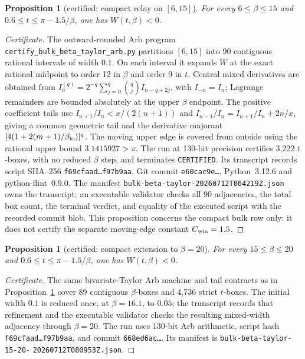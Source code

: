 \documentclass[11pt]{article}
\newtheorem{proposition}[theorem]{Proposition}
\theoremstyle{remark}
\begin{document}
\begin{proposition}[{certified; compact relay on $[6,15]$}]
\label{prop:bulkbetaTaylor}
For every $6\le\beta\le15$ and
$0.6\le t\le\pi-1.5/\beta$, one has $W(t,\beta)<0$.
\end{proposition}

\begin{proof}[Certificate]
The outward-rounded Arb program
\texttt{certify\_bulk\_beta\_taylor\_arb.py} partitions $[6,15]$
into 90 contiguous rational intervals of width $0.1$.  On each interval it
expands $W$ at the exact rational midpoint to order 12 in $\beta$ and order
9 in $t$.  Central mixed derivatives are obtained from
$I_n^{(q)}=2^{-q}\sum_{j=0}^q\binom qj I_{n-q+2j}$, with
$I_{-n}=I_n$; Lagrange remainders are bounded absolutely at the upper
$\beta$ endpoint.  The positive coefficient tails use
$I_{n+1}/I_n<x/(2(n+1))$ and
$I_{n-1}/I_n=I_{n+1}/I_n+2n/x$, giving a common geometric tail and the
derivative majorant
$[4(1+2(m+1)/\beta_{\rm lo})]^q$.
The moving upper edge is covered from outside using the rational upper
bound $3.1415927>\pi$.  The run at 130-bit precision certifies 3,222
$t$-boxes, with no reduced $\beta$ step, and terminates
\texttt{CERTIFIED}.  Its transcript records script SHA--256
\texttt{f69cfaad\ldots f97b9aa}, Git commit
\texttt{e60cac9e\ldots}, Python~3.12.6 and python-flint~0.9.0.
The manifest \texttt{bulk-beta-taylor-20260712T064219Z.json} owns the
transcript; an executable validator checks all 90 adjacencies, the total
box count, the terminal verdict, and equality of the executed script with
the recorded commit blob.  This proposition concerns the compact bulk row
only: it does not certify the separate moving-edge constant
$C_{\rm win}=1.5$.
\end{proof}

\begin{proposition}[certified; compact extension to $\beta=20$]
\label{prop:bulkbetaTaylorExtension}
For every $15\le\beta\le20$ and
$0.6\le t\le\pi-1.5/\beta$, one has $W(t,\beta)<0$.
\end{proposition}

\begin{proof}[Certificate]
The same bivariate-Taylor Arb machine and tail contracts as in
Proposition~\ref{prop:bulkbetaTaylor} cover 89 contiguous $\beta$-boxes
and 4,736 strict $t$-boxes.  The initial width $0.1$ is reduced once, at
$\beta=16.1$, to $0.05$; the transcript records that refinement and the
executable validator checks the resulting mixed-width adjacency through
$\beta=20$.  The run uses 130-bit Arb arithmetic, script hash
\texttt{f69cfaad\ldots f97b9aa}, and commit
\texttt{668ed6ac\ldots}.  Its manifest is
\texttt{bulk-beta-taylor-15-20-}\allowbreak
\texttt{20260712T080953Z.json}.
\end{proof}
\end{document}
